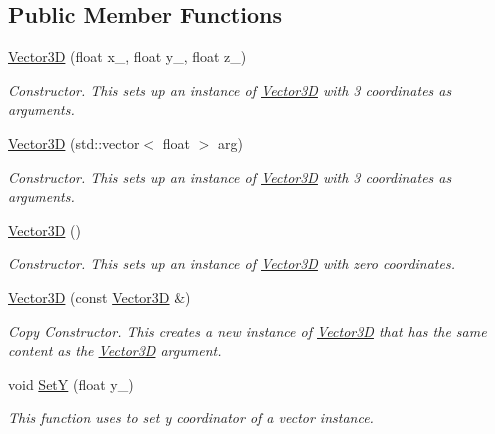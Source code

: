 \subsection*{Public Member Functions}
\begin{DoxyCompactItemize}
\item 
\hyperlink{classcsci3081_1_1Vector3D_a34cb5ed59fd4bd810516eea03143f186}{Vector3D} (float x\+\_\+, float y\+\_\+, float z\+\_\+)
\begin{DoxyCompactList}\small\item\em Constructor. This sets up an instance of \hyperlink{classcsci3081_1_1Vector3D}{Vector3D} with 3 coordinates as arguments. \end{DoxyCompactList}\item 
\hyperlink{classcsci3081_1_1Vector3D_a62fb658f949d3f12334042ce2609ac2c}{Vector3D} (std\+::vector$<$ float $>$ arg)
\begin{DoxyCompactList}\small\item\em Constructor. This sets up an instance of \hyperlink{classcsci3081_1_1Vector3D}{Vector3D} with 3 coordinates as arguments. \end{DoxyCompactList}\item 
\mbox{\label{classcsci3081_1_1Vector3D_ac86652cdb07e58fadbf9c7223360a0e2}} 
\hyperlink{classcsci3081_1_1Vector3D_ac86652cdb07e58fadbf9c7223360a0e2}{Vector3D} ()
\begin{DoxyCompactList}\small\item\em Constructor. This sets up an instance of \hyperlink{classcsci3081_1_1Vector3D}{Vector3D} with zero coordinates. \end{DoxyCompactList}\item 
\hyperlink{classcsci3081_1_1Vector3D_ad7df91c42392421b6fa81a5f8e6487bf}{Vector3D} (const \hyperlink{classcsci3081_1_1Vector3D}{Vector3D} \&)
\begin{DoxyCompactList}\small\item\em Copy Constructor. This creates a new instance of \hyperlink{classcsci3081_1_1Vector3D}{Vector3D} that has the same content as the \hyperlink{classcsci3081_1_1Vector3D}{Vector3D} argument. \end{DoxyCompactList}\item 
void \hyperlink{classcsci3081_1_1Vector3D_a6732592915b953a71dcaa8e9d87d294c}{SetY} (float y\+\_\+)
\begin{DoxyCompactList}\small\item\em This function uses to set y coordinator of a vector instance. \end{DoxyCompactList}\item 

\end{DoxyCompactItemize}
